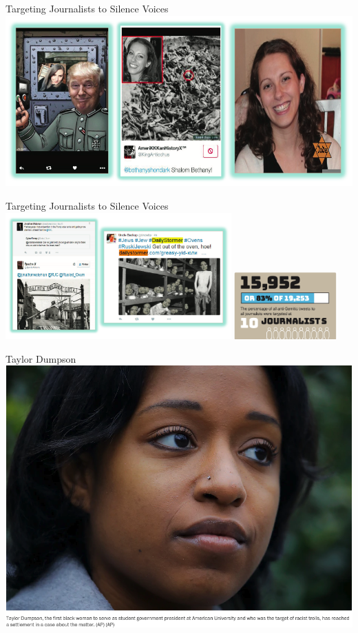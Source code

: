 \documentclass[nobackground,dvipsnames,table,aspectratio=169]{beamer}
\begin{document}
\begin{frame}{Targeting Journalists to Silence Voices}
    \includegraphics[width=\textwidth]{targeting-journalists}
\end{frame}

\begin{frame}{Targeting Journalists to Silence Voices}
    \includegraphics[width=0.65\textwidth]{silencing-journalists-holocaust}
    \includegraphics[width=0.3\textwidth]{anti-semitic-tweets-stats}
\end{frame}

\begin{frame}{Taylor Dumpson}
    \includegraphics[width=\textwidth]{taylor-dumpson}
\end{frame}
\end{document}
